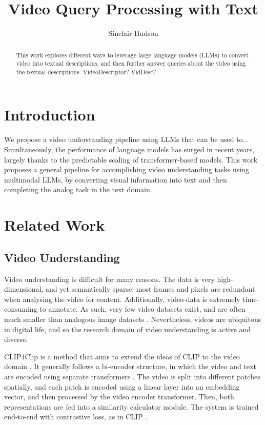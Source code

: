 \documentclass{article}
\title{Video Query Processing with Text}
\author{Sinclair Hudson}
\begin{document}
\maketitle

\begin{abstract}
      This work explores different ways to leverage large language models (LLMs) to convert video into textual descriptions, and then further answer queries about the video using the textual descriptions.
      VideoDescriptor?
      VidDesc?
\end{abstract}

\section{Introduction}

We propose a video understanding pipeline using LLMs that can be used to...
Simultaneously, the performance of language models has surged in recent years, largely thanks to the predictable scaling of transformer-based models.
This work proposes a general pipeline for accomplishing video understanding tasks using multimodal LLMs, by converting visual information into text and then completing the analog task in the text domain.

\section{Related Work}

\subsection{Video Understanding}

Video understanding is difficult for many reasons.
The data is very high-dimensional, and yet semantically sparse; most frames and pixels are redundant when analysing the video for content.
Additionally, video-data is extremely time-consuming to annotate.
As such, very few video datasets exist, and are often much smaller than analogous image datasets \cite{imagenet} \cite{COCO}.
Nevertheless, videos are ubiquitous in digital life, and so the research domain of video understanding is active and diverse.

CLIP4Clip is a method that aims to extend the ideas of CLIP \cite{clip} to the video domain \cite{clip4clip}.
It generally follows a bi-encoder structure, in which the video and text are encoded using separate transformers \cite{transformer}.
The video is split into different patches spatially, and each patch is encoded using a linear layer into an embedding vector, and then processed by the video encoder transformer.
Then, both representations are fed into a similarity calculator module.
The system is trained end-to-end with contrastive loss, as in CLIP \cite{clip}.
\end{document}
